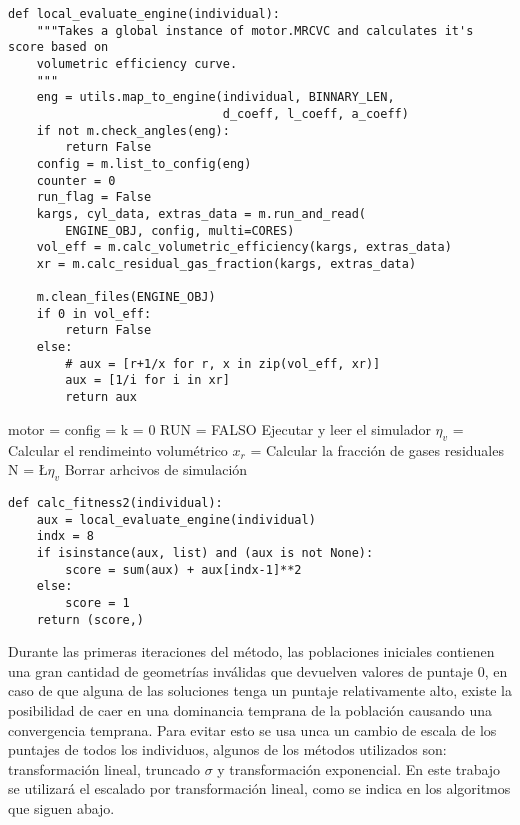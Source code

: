 \begin{lstlisting}[float,label=lst:label,caption=falta]
def local_evaluate_engine(individual):
    """Takes a global instance of motor.MRCVC and calculates it's score based on
    volumetric efficiency curve.
    """
    eng = utils.map_to_engine(individual, BINNARY_LEN,
                              d_coeff, l_coeff, a_coeff)
    if not m.check_angles(eng):
        return False
    config = m.list_to_config(eng)
    counter = 0
    run_flag = False
    kargs, cyl_data, extras_data = m.run_and_read(
        ENGINE_OBJ, config, multi=CORES)
    vol_eff = m.calc_volumetric_efficiency(kargs, extras_data)
    xr = m.calc_residual_gas_fraction(kargs, extras_data)

    m.clean_files(ENGINE_OBJ)
    if 0 in vol_eff:
        return False
    else:
        # aux = [r+1/x for r, x in zip(vol_eff, xr)]
        aux = [1/i for i in xr]
        return aux
\end{lstlisting}

\begin{algorithm}
  \KwOut{}
  \BlankLine

  motor = \;
  config = \;
  k = 0\;
  RUN = FALSO\;
  Ejecutar y leer el simulador\;
  $\eta_{v}$ = Calcular el rendimeinto volumétrico\;
  $x_{r}$ = Calcular la fracción de gases residuales\;
  N = \L{$\eta_{v}$}
  Borrar arhcivos de simulación\;
\end{algorithm}


\begin{lstlisting}[float,label=lst:label,caption=falta]
def calc_fitness2(individual):
    aux = local_evaluate_engine(individual)
    indx = 8
    if isinstance(aux, list) and (aux is not None):
        score = sum(aux) + aux[indx-1]**2
    else:
        score = 1
    return (score,)
\end{lstlisting}

Durante las primeras iteraciones del método, las poblaciones iniciales contienen
una gran cantidad de geometrías inválidas que devuelven valores de puntaje 0, en
caso de que alguna de las soluciones tenga un puntaje relativamente alto, existe
la posibilidad de caer en una dominancia temprana de la población causando una
convergencia temprana.
%
Para evitar esto se usa unca un cambio de escala de los puntajes de todos los
individuos, algunos de los métodos utilizados son: transformación lineal,
truncado $\sigma$ y transformación exponencial.
%
En este trabajo se utilizará el escalado por transformación lineal, como se
indica en los algoritmos que siguen abajo.

